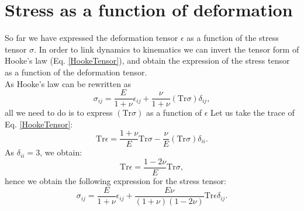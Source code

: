 \documentclass[DIV=12]{article}
\newcommand{\Tr}{\mathrm{Tr}}
\begin{document}
\section{Stress as a function of deformation}
So far we have expressed the deformation tensor $\epsilon$ as a function of the stress 
tensor $\sigma$. In order to link dynamics to kinematics we can invert the tensor form of Hooke's law (Eq. \ref{HookeTensor}),
 and obtain the expression of the stress tensor as a function of the deformation tensor.\\

As Hooke's law can be rewritten as
\begin{equation}
 \sigma_{ij}= \frac{E}{1+\nu}\epsilon_{ij} +\frac{\nu}{1 + \nu} \left( \Tr\sigma \right) \delta_{ij},
\end{equation}
all we need to do is to express $\left( \Tr\sigma \right)$ as a function of $\epsilon$
 Let us take the trace of Eq. \ref{HookeTensor}:
\begin{equation}
 \Tr \epsilon =  \frac{1+\nu}{E} \Tr \sigma - \frac{\nu}{E}\left( \Tr\sigma \right) \delta_{ii}.
\end{equation}
As $\delta_{ii} =3$, we obtain: 
\begin{equation}
\Tr \epsilon =  \frac{1-2\nu}{E} \Tr \sigma,
\end{equation}
hence we obtain the following expression for the stress tensor:
\begin{equation}
 \boxed{\sigma_{ij}= \frac{E}{1+\nu}\epsilon_{ij} +\frac{E\nu}{(1 + \nu)(1-2\nu)} \Tr \epsilon \delta_{ij}.}
\end{equation}
\end{document}
